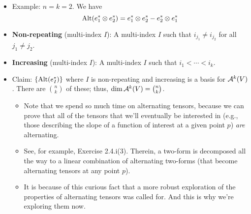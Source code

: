 \documentclass[../notes.tex]{subfiles}
\begin{document}
\begin{itemize}
    \item Example: $n=k=2$. We have
    \begin{equation*}
        \Alt(e_1^*\otimes e_2^*) = e_1^*\otimes e_2^*-e_2^*\otimes e_1^*
    \end{equation*}
    \item \textbf{Non-repeating} (multi-index $I$): A multi-index $I$ such that $i_{j_1}\neq i_{j_2}$ for all $j_1\neq j_2$.
    \item \textbf{Increasing} (multi-index $I$): A multi-index $I$ such that $i_1<\cdots<i_k$.
    \item Claim: $\{\Alt(e_I^*)\}$ where $I$ is non-repeating and increasing is a basis for $\alt[k]{V}$. There are $\binom{n}{k}$ of these; thus, $\dim\alt[k]{V}=\binom{n}{k}$.
    \begin{itemize}
        \item Note that we spend so much time on alternating tensors, because we can prove that all of the tensors that we'll eventually be interested in (e.g., those describing the slope of a function of interest at a given point $p$) \emph{are} alternating.
        \item See, for example, Exercise 2.4.i(3). Therein, a two-form is decomposed all the way to a linear combination of alternating two-forms (that become alternating tensors at any point $p$).
        \item It is because of this curious fact that a more robust exploration of the properties of alternating tensors was called for. And this is why we're exploring them now. 
    \end{itemize}
\end{itemize}
\end{document}
